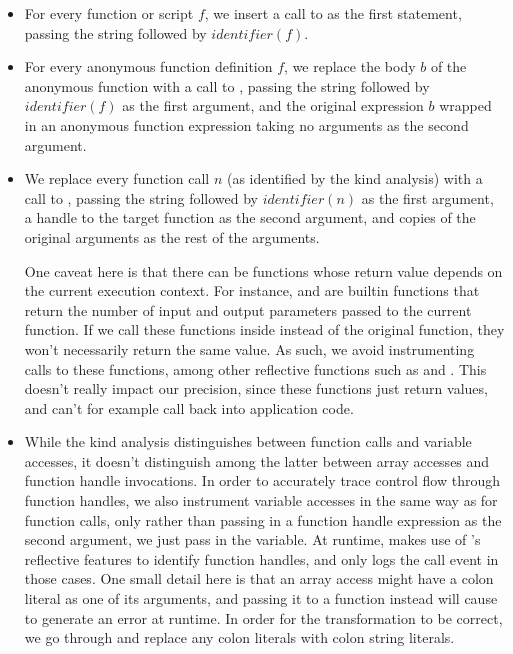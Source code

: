 \begin{itemize}

\item For every function or script $f$, we insert a call to
   as the first statement, passing the string
   followed by $identifier(f)$.

\item For every anonymous function definition $f$, we replace the body $b$ of the
  anonymous function with a call to ,
  passing the string  followed by $identifier(f)$ as the first
  argument, and the original expression $b$ wrapped in an anonymous function
  expression taking no arguments as the second argument.

\item We replace every function call $n$ (as identified by the kind analysis)
  with a call to , passing the string
   followed by $identifier(n)$ as the first argument, a handle to
  the target function as the second argument, and copies of the original
  arguments as the rest of the arguments.

  One caveat here is that there can be functions whose return value
  depends on the current execution context. For instance,  and
   are builtin functions that return the number of input and
  output parameters passed to the current function. If we call these functions
  inside  instead of the original
  function, they won't necessarily return the same value. As such, we avoid
  instrumenting calls to these functions, among other reflective functions such
  as  and . This doesn't really impact our
  precision, since these functions just return values, and can't for example
  call back into application code.

\item While the kind analysis distinguishes between function calls and variable
  accesses, it doesn't distinguish among the latter between array accesses and
  function handle invocations. In order to accurately trace control flow through
  function handles, we also instrument variable accesses in the same way as for
  function calls, only rather than passing in a function handle expression as
  the second argument, we just pass in the variable. At runtime,
   makes use of \matlab's reflective
  features to identify function handles, and only logs the call event in those
  cases. One small detail here is that an array access might have a colon
  literal as one of its arguments, and passing it to a function instead will
  cause \matlab to generate an error at runtime. In order for the
  transformation to be correct, we go through and replace any colon literals
  with colon string literals.

\end{itemize}

